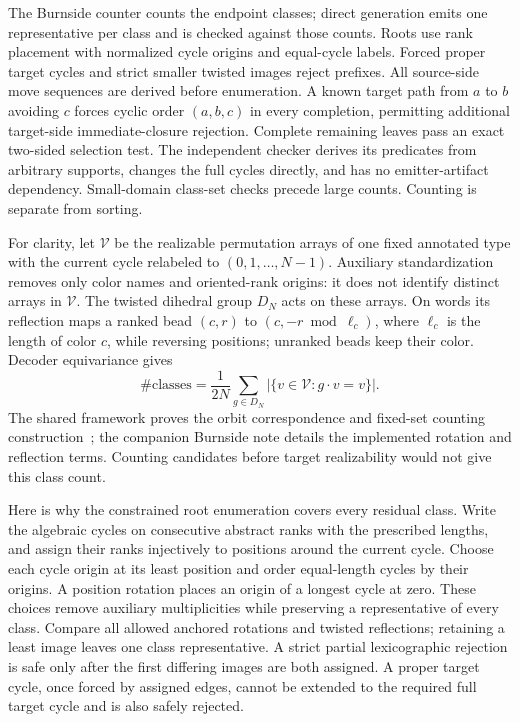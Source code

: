 \documentclass[11pt,a4paper]{article}
\begin{document}
The Burnside counter counts the endpoint classes; direct generation emits one
representative per class and is checked against those counts. Roots use rank
placement with normalized cycle origins and equal-cycle labels. Forced proper
target cycles and strict smaller twisted images reject prefixes. All
source-side move sequences are derived before enumeration. A known target path
from $a$ to $b$ avoiding $c$ forces cyclic order $(a,b,c)$ in every completion,
permitting additional target-side immediate-closure rejection. Complete remaining
leaves pass an exact two-sided selection test. The independent checker derives
its predicates from arbitrary supports, changes the full cycles directly, and
has no emitter-artifact dependency. Small-domain class-set checks precede large
counts. Counting is separate from sorting.


For clarity, let $\mathcal V$ be the realizable permutation arrays of one
fixed annotated type with the current cycle relabeled to
$(0,1,\ldots,N-1)$. Auxiliary standardization removes only color names and
oriented-rank origins: it does not identify distinct arrays in $\mathcal V$.
The twisted dihedral group $D_N$ acts on these arrays. On words its reflection
maps a ranked bead $(c,r)$ to $(c,-r\bmod\ell_c)$, where $\ell_c$ is
the length of color $c$, while reversing positions;
unranked beads keep their color. Decoder equivariance gives
\[
 \#\text{classes}=\frac{1}{2N}\sum_{g\in D_N}
       |\{v\in\mathcal V:g\cdot v=v\}|.
\]
The shared framework proves the orbit correspondence and fixed-set counting
construction~\cite{framework}; the companion Burnside note details the
implemented rotation and reflection terms. Counting candidates before target
realizability would not give this class count.

Here is why the constrained root enumeration covers every residual class.
Write the algebraic cycles on consecutive abstract ranks with the prescribed
lengths, and assign their ranks injectively to positions around the current
cycle. Choose each cycle origin at its least position and order equal-length
cycles by their origins. A position rotation places an origin of a longest
cycle at zero. These choices remove auxiliary multiplicities while preserving
a representative of every class. Compare all allowed anchored rotations and
twisted reflections; retaining a least image leaves one class representative.
A strict partial lexicographic rejection is safe only after the first differing
images are both assigned. A proper target cycle, once forced by assigned edges,
cannot be extended to the required full target cycle and is also safely rejected.
\end{document}
